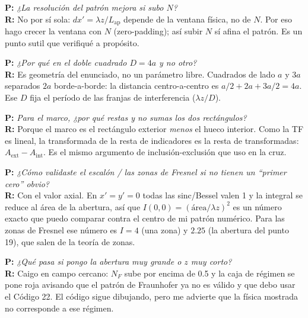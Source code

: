 \documentclass[11pt,a4paper]{article}
\begin{document}
\begin{pregunta}
\textcolor{rojo}{\textbf{P:}} \emph{¿La resolución del patrón mejora si subo $N$?}\\
\textbf{R:} No por sí sola: $dx'=\lambda z/L_\text{ap}$ depende de la ventana física,
no de $N$. Por eso hago crecer la ventana con $N$ (zero-padding); así subir $N$ sí
afina el patrón. Es un punto sutil que verifiqué a propósito.
\end{pregunta}

\begin{pregunta}
\textcolor{rojo}{\textbf{P:}} \emph{¿Por qué en el doble cuadrado $D=4a$ y no otro?}\\
\textbf{R:} Es geometría del enunciado, no un parámetro libre. Cuadrados de lado $a$
y $3a$ separados $2a$ borde-a-borde: la distancia centro-a-centro es
$a/2+2a+3a/2=4a$. Ese $D$ fija el período de las franjas de interferencia
($\lambda z/D$).
\end{pregunta}

\begin{pregunta}
\textcolor{rojo}{\textbf{P:}} \emph{Para el marco, ¿por qué restas y no sumas los
dos rectángulos?}\\
\textbf{R:} Porque el marco es el rectángulo exterior \emph{menos} el hueco
interior. Como la TF es lineal, la transformada de la resta de indicadores es la
resta de transformadas: $A_\text{ext}-A_\text{int}$. Es el mismo argumento de
inclusión-exclusión que uso en la cruz.
\end{pregunta}

\begin{pregunta}
\textcolor{rojo}{\textbf{P:}} \emph{¿Cómo validaste el escalón / las zonas de Fresnel
si no tienen un ``primer cero'' obvio?}\\
\textbf{R:} Con el valor axial. En $x'=y'=0$ todas las sinc/Bessel valen 1 y la
integral se reduce al área de la abertura, así que $I(0,0)=(\text{área}/\lambda z)^2$
es un número exacto que puedo comparar contra el centro de mi patrón numérico. Para
las zonas de Fresnel ese número es $I=4$ (una zona) y $2.25$ (la abertura del
punto 19), que salen de la teoría de zonas.
\end{pregunta}

\begin{pregunta}
\textcolor{rojo}{\textbf{P:}} \emph{¿Qué pasa si pongo la abertura muy grande o $z$
muy corto?}\\
\textbf{R:} Caigo en campo cercano: $N_F$ sube por encima de 0.5 y la caja de
régimen se pone roja avisando que el patrón de Fraunhofer ya no es válido y que
debo usar el Código 22. El código sigue dibujando, pero me advierte que la física
mostrada no corresponde a ese régimen.
\end{pregunta}
\end{document}
